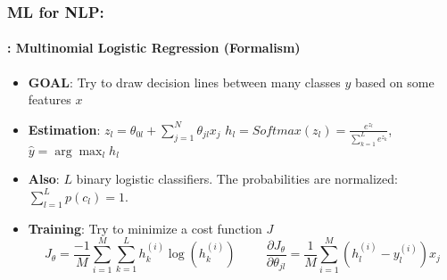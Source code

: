 \documentclass[xcolor=table]{beamer}
\begin{document}
	\begin{frame}
		\frametitle{ML for NLP: \insertsection}
		\framesubtitle{\insertsubsection: Multinomial Logistic Regression (Formalism)}
		
		\begin{minipage}{0.7\textwidth} 
			\begin{itemize}
				\item \textbf{GOAL}: Try to draw decision lines between many classes $ y $ based on some features $ x $
				\item \textbf{Estimation}: $ z_l = \theta_{0l} + \sum_{j=1}^{N} \theta_{jl} x_j $
				$ h_l = Softmax(z_l) = \frac{e^{z_l}}{\sum_{k=1}^{L} e^{z_k}}$, $ \hat{y} = \arg\max_{l} h_l$
				\item \textbf{Also}: $ L $ binary logistic classifiers. 
				The probabilities are normalized: $ \sum_{l=1}^{L} p(c_l) = 1$.
			\end{itemize}
		\end{minipage}
		\begin{minipage}{0.29\textwidth} 
		\end{minipage}
	
		\begin{itemize}
			\item \textbf{Training}: Try to minimize a cost function $ J $
			\[J_\theta = \frac{-1}{M} \sum\limits_{i=1}^{M} \sum_{k=1}^{L} h^{(i)}_k \log(h^{(i)}_k)
			\hspace{1cm}
			\frac{\partial J_\theta}{\partial \theta_{jl}} = \frac{1}{M} \sum\limits_{i=1}^{M} (h_l^{(i)} - y_l^{(i)}) x_j
			\]
		\end{itemize}
		
	\end{frame}
\end{document}
